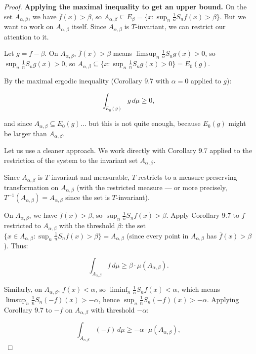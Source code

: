 \begin{proof}
\textbf{Applying the maximal inequality to get an upper bound.} On the set $A_{\alpha, \beta}$, we have $\overline{f}(x) > \beta$, so $A_{\alpha, \beta} \subseteq E_\beta = \{x : \sup_n \frac{1}{n} S_n f(x) > \beta\}$. But we want to work on $A_{\alpha, \beta}$ itself. Since $A_{\alpha, \beta}$ is $T$-invariant, we can restrict our attention to it.

Let $g = f - \beta$. On $A_{\alpha,\beta}$, $\overline{f}(x) > \beta$ means $\limsup_n \frac{1}{n} S_n g(x) > 0$, so $\sup_n \frac{1}{n} S_n g(x) > 0$, so $A_{\alpha, \beta} \subseteq \{x : \sup_n \frac{1}{n} S_n g(x) > 0\} = E_0(g)$.

By the maximal ergodic inequality (Corollary 9.7 with $\alpha = 0$ applied to $g$):

\[
\int_{E_0(g)} g \, d\mu \geq 0,
\]

and since $A_{\alpha,\beta} \subseteq E_0(g)$... but this is not quite enough, because $E_0(g)$ might be larger than $A_{\alpha,\beta}$.

Let us use a cleaner approach. We work directly with Corollary 9.7 applied to the restriction of the system to the invariant set $A_{\alpha, \beta}$.

Since $A_{\alpha, \beta}$ is $T$-invariant and measurable, $T$ restricts to a measure-preserving transformation on $A_{\alpha, \beta}$ (with the restricted measure --- or more precisely, $T^{-1}(A_{\alpha,\beta}) = A_{\alpha,\beta}$ since the set is $T$-invariant).

On $A_{\alpha,\beta}$, we have $\overline{f}(x) > \beta$, so $\sup_n \frac{1}{n} S_n f(x) > \beta$. Apply Corollary 9.7 to $f$ restricted to $A_{\alpha,\beta}$ with the threshold $\beta$: the set $\{x \in A_{\alpha,\beta} : \sup_n \frac{1}{n} S_n f(x) > \beta\} = A_{\alpha,\beta}$ (since every point in $A_{\alpha,\beta}$ has $\overline{f}(x) > \beta$). Thus:

\begin{equation}\label{eq:1}\tag{1}
\int_{A_{\alpha,\beta}} f \, d\mu \geq \beta \cdot \mu(A_{\alpha,\beta}).
\end{equation}

Similarly, on $A_{\alpha,\beta}$, $\underline{f}(x) < \alpha$, so $\liminf_n \frac{1}{n} S_n f(x) < \alpha$, which means $\limsup_n \frac{1}{n} S_n(-f)(x) > -\alpha$, hence $\sup_n \frac{1}{n} S_n(-f)(x) > -\alpha$. Applying Corollary 9.7 to $-f$ on $A_{\alpha,\beta}$ with threshold $-\alpha$:

\[
\int_{A_{\alpha,\beta}} (-f) \, d\mu \geq -\alpha \cdot \mu(A_{\alpha,\beta}),
\]


\end{proof}
